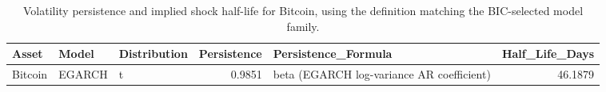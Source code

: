 \begin{table}
\caption{Volatility persistence and implied shock half-life for Bitcoin, using the definition matching the BIC-selected model family.}
\label{tab:persistence_bitcoin}
\begin{tabular}{lllrlr}
\toprule
Asset & Model & Distribution & Persistence & Persistence\_Formula & Half\_Life\_Days \\
\midrule
Bitcoin & EGARCH & t & 0.9851 & beta (EGARCH log-variance AR coefficient) & 46.1879 \\
\bottomrule
\end{tabular}
\end{table}

